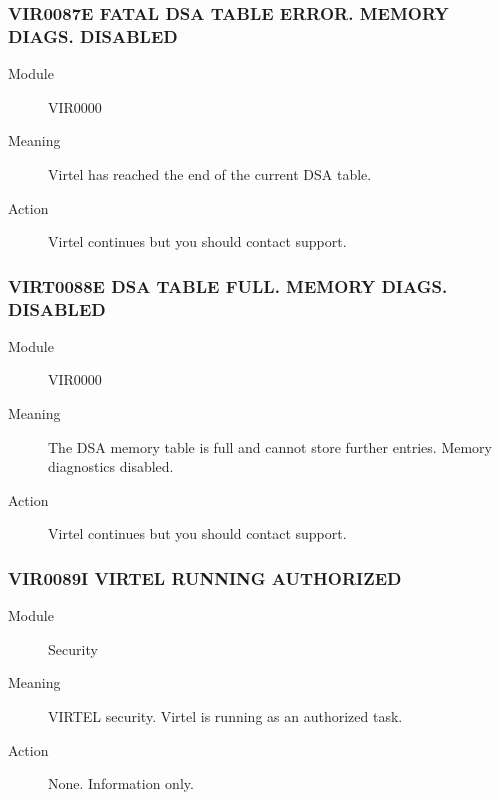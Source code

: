 \documentclass[letterpaper,10pt,english]{sphinxmanual}
\begin{document}
\subsubsection{VIR0087E FATAL DSA TABLE ERROR. MEMORY DIAGS. DISABLED}
\label{\detokenize{messages:vir0087e-fatal-dsa-table-error-memory-diags-disabled}}\begin{description}
\item[{Module}] \leavevmode
VIR0000

\item[{Meaning}] \leavevmode
Virtel has reached the end of the current DSA table.

\item[{Action}] \leavevmode
Virtel continues but you should contact support.

\end{description}


\subsubsection{VIRT0088E DSA TABLE FULL. MEMORY DIAGS. DISABLED}
\label{\detokenize{messages:virt0088e-dsa-table-full-memory-diags-disabled}}\begin{description}
\item[{Module}] \leavevmode
VIR0000

\item[{Meaning}] \leavevmode
The DSA memory table is full and cannot store further entries. Memory diagnostics disabled.

\item[{Action}] \leavevmode
Virtel continues but you should contact support.

\end{description}


\subsubsection{VIR0089I VIRTEL RUNNING AUTHORIZED}
\label{\detokenize{messages:vir0089i-virtel-running-authorized}}\begin{description}
\item[{Module}] \leavevmode
Security

\item[{Meaning}] \leavevmode
VIRTEL security. Virtel is running as an authorized task.

\item[{Action}] \leavevmode
None. Information only.

\end{description}
\end{document}
